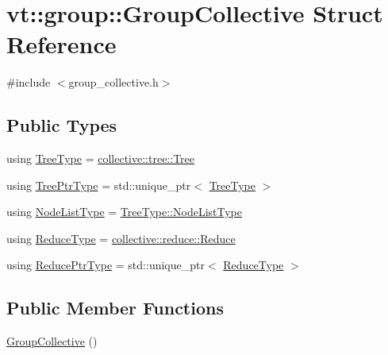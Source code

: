 \hypertarget{structvt_1_1group_1_1_group_collective}{}\section{vt\+:\+:group\+:\+:Group\+Collective Struct Reference}
\label{structvt_1_1group_1_1_group_collective}


{\ttfamily \#include $<$group\+\_\+collective.\+h$>$}

\subsection*{Public Types}
\begin{DoxyCompactItemize}
\item 
using \hyperlink{structvt_1_1group_1_1_group_collective_abae59cc0eb4512145a039fb47fff6a25}{Tree\+Type} = \hyperlink{structvt_1_1collective_1_1tree_1_1_tree}{collective\+::tree\+::\+Tree}
\item 
using \hyperlink{structvt_1_1group_1_1_group_collective_a2e02dc375f193620af9832f187029188}{Tree\+Ptr\+Type} = std\+::unique\+\_\+ptr$<$ \hyperlink{structvt_1_1group_1_1_group_collective_abae59cc0eb4512145a039fb47fff6a25}{Tree\+Type} $>$
\item 
using \hyperlink{structvt_1_1group_1_1_group_collective_a24ad1fd43cf03d5026de910d85c7ac96}{Node\+List\+Type} = \hyperlink{structvt_1_1collective_1_1tree_1_1_tree_a834e7b54ea2dceae42db7c5ea859753f}{Tree\+Type\+::\+Node\+List\+Type}
\item 
using \hyperlink{structvt_1_1group_1_1_group_collective_acc03682a21dc3e4293720c0f6677c88d}{Reduce\+Type} = \hyperlink{structvt_1_1collective_1_1reduce_1_1_reduce}{collective\+::reduce\+::\+Reduce}
\item 
using \hyperlink{structvt_1_1group_1_1_group_collective_a01cba346d413026bc58941d18fd404e6}{Reduce\+Ptr\+Type} = std\+::unique\+\_\+ptr$<$ \hyperlink{structvt_1_1group_1_1_group_collective_acc03682a21dc3e4293720c0f6677c88d}{Reduce\+Type} $>$
\end{DoxyCompactItemize}
\subsection*{Public Member Functions}
\begin{DoxyCompactItemize}
\item 
\hyperlink{structvt_1_1group_1_1_group_collective_ac4cfd3e8f098c8baeb4fc9898ca5f412}{Group\+Collective} ()
\end{DoxyCompactItemize}
